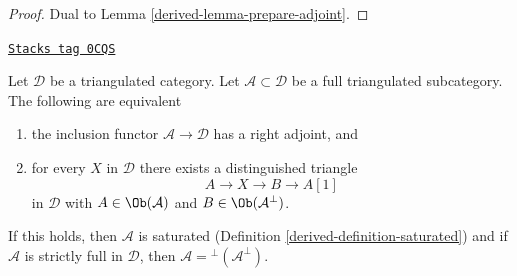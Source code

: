 \begin{proof}

Dual to Lemma \ref{derived-lemma-prepare-adjoint}.
\end{proof}

\begin{lemma}
\label{derived-lemma-right-adjoint}
\href{https://stacks.math.columbia.edu/tag/0CQS}{\texttt{Stacks tag 0CQS}}

Let $\mathcal{D}$ be a triangulated category. Let
$\mathcal{A} \subset \mathcal{D}$ be a full triangulated subcategory.
The following are equivalent
\begin{enumerate}
\item the inclusion functor $\mathcal{A} \to \mathcal{D}$
has a right adjoint, and
\item for every $X$ in $\mathcal{D}$ there exists a distinguished
triangle
$$
A \to X \to B \to A[1]
$$
in $\mathcal{D}$ with $A \in \Ob(\mathcal{A})$ and
$B \in \Ob(\mathcal{A}^\perp)$.
\end{enumerate}
If this holds, then $\mathcal{A}$ is saturated
(Definition \ref{derived-definition-saturated}) and if $\mathcal{A}$
is strictly full in $\mathcal{D}$, then
$\mathcal{A} = {}^\perp(\mathcal{A}^\perp)$.
\end{lemma}

